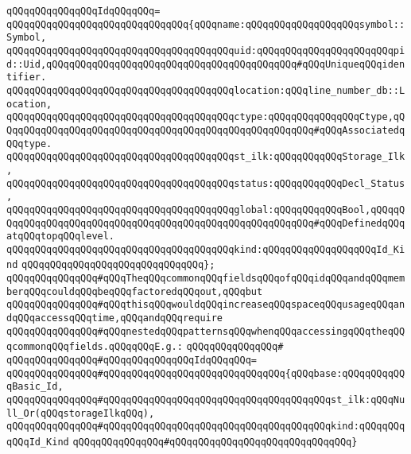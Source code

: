 \verb|qQQqqQQqqQQqqQQqIdqQQqqQQq=|\newline
\verb|qQQqqQQqqQQqqQQqqQQqqQQqqQQqqQQq{qQQqname:qQQqqQQqqQQqqQQqqQQqsymbol::Symbol,|\newline
\verb|qQQqqQQqqQQqqQQqqQQqqQQqqQQqqQQqqQQqqQQquid:qQQqqQQqqQQqqQQqqQQqqQQqpid::Uid,qQQqqQQqqQQqqQQqqQQqqQQqqQQqqQQqqQQqqQQqqQQq#qQQqUniqueqQQqidentifier.|\newline
\verb|qQQqqQQqqQQqqQQqqQQqqQQqqQQqqQQqqQQqqQQqlocation:qQQqline_number_db::Location,|\newline
\verb|qQQqqQQqqQQqqQQqqQQqqQQqqQQqqQQqqQQqqQQqctype:qQQqqQQqqQQqqQQqCtype,qQQqqQQqqQQqqQQqqQQqqQQqqQQqqQQqqQQqqQQqqQQqqQQqqQQqqQQq#qQQqAssociatedqQQqtype.|\newline
\verb|qQQqqQQqqQQqqQQqqQQqqQQqqQQqqQQqqQQqqQQqst_ilk:qQQqqQQqqQQqStorage_Ilk,|\newline
\verb|qQQqqQQqqQQqqQQqqQQqqQQqqQQqqQQqqQQqqQQqstatus:qQQqqQQqqQQqDecl_Status,|\newline
\verb|qQQqqQQqqQQqqQQqqQQqqQQqqQQqqQQqqQQqqQQqglobal:qQQqqQQqqQQqBool,qQQqqQQqqQQqqQQqqQQqqQQqqQQqqQQqqQQqqQQqqQQqqQQqqQQqqQQqqQQq#qQQqDefinedqQQqatqQQqtopqQQqlevel.|\newline
\verb|qQQqqQQqqQQqqQQqqQQqqQQqqQQqqQQqqQQqqQQqkind:qQQqqQQqqQQqqQQqqQQqId_Kind|\newline
\verb|qQQqqQQqqQQqqQQqqQQqqQQqqQQqqQQq};|\newline
\newline
\verb|qQQqqQQqqQQqqQQq#qQQqTheqQQqcommonqQQqfieldsqQQqofqQQqidqQQqandqQQqmemberqQQqcouldqQQqbeqQQqfactoredqQQqout,qQQqbut|\newline
\verb|qQQqqQQqqQQqqQQq#qQQqthisqQQqwouldqQQqincreaseqQQqspaceqQQqusageqQQqandqQQqaccessqQQqtime,qQQqandqQQqrequire|\newline
\verb|qQQqqQQqqQQqqQQq#qQQqnestedqQQqpatternsqQQqwhenqQQqaccessingqQQqtheqQQqcommonqQQqfields.qQQqqQQqE.g.:|\newline
\verb|qQQqqQQqqQQqqQQq#|\newline
\verb|qQQqqQQqqQQqqQQq#qQQqqQQqqQQqqQQqIdqQQqqQQq=|\newline
\verb|qQQqqQQqqQQqqQQq#qQQqqQQqqQQqqQQqqQQqqQQqqQQqqQQq{qQQqbase:qQQqqQQqqQQqBasic_Id,|\newline
\verb|qQQqqQQqqQQqqQQq#qQQqqQQqqQQqqQQqqQQqqQQqqQQqqQQqqQQqqQQqst_ilk:qQQqNull_Or(qQQqstorageIlkqQQq),|\newline
\verb|qQQqqQQqqQQqqQQq#qQQqqQQqqQQqqQQqqQQqqQQqqQQqqQQqqQQqqQQqkind:qQQqqQQqqQQqId_Kind|\newline
\verb|qQQqqQQqqQQqqQQq#qQQqqQQqqQQqqQQqqQQqqQQqqQQqqQQq}|\newline
